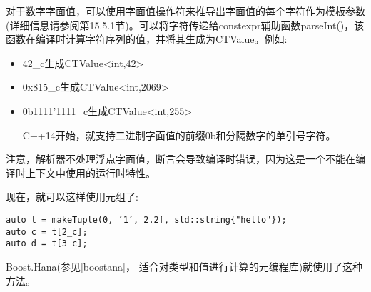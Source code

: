 对于数字字面值，可以使用字面值操作符来推导出字面值的每个字符作为模板参数(详细信息请参阅第15.5.1节)。可以将字符传递给constexpr辅助函数parseInt()，该函数在编译时计算字符序列的值，并将其生成为CTValue。例如:

\begin{itemize}
\item 
42\_c生成CTValue<int,42>

\item 
0x815\_c生成CTValue<int,2069>

\item 
0b1111’1111\_c生成CTValue<int,255>

\begin{tcolorbox}[colback=webgreen!5!white,colframe=webgreen!75!black]
\hspace*{0.75cm}C++14开始，就支持二进制字面值的前缀0b和分隔数字的单引号字符。
\end{tcolorbox}
\end{itemize}

注意，解析器不处理浮点字面值，断言会导致编译时错误，因为这是一个不能在编译时上下文中使用的运行时特性。

现在，就可以这样使用元组了:

\begin{lstlisting}[style=styleCXX]
auto t = makeTuple(0, ’1’, 2.2f, std::string{"hello"});
auto c = t[2_c];
auto d = t[3_c];
\end{lstlisting}

Boost.Hana(参见[boostana]， 适合对类型和值进行计算的元编程库)就使用了这种方法。



























